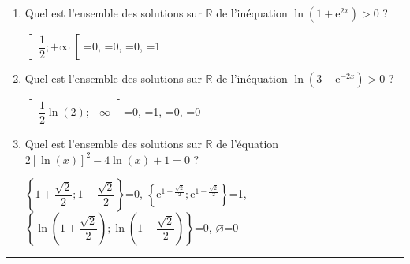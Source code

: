 \documentclass[french]{article}
\begin{document}
\begin{spacing}{1.2}
\begin{enumerate}
\item Quel est l'ensemble des solutions sur \(\mathbb{R}\) de l'inéquation \(\ln\left(1+\text{e}^{2x}\right)>0\) ?

\begin{Form}
\ChoiceMenu[radio,name=Q6,default=-0,align=0,radiosymbol=\ding{108},height=0.2cm,bordercolor=black]{}
{{\(\left]\dfrac{1}{2};+\infty\right[\)}=0,
\newline {\(\left]\dfrac{-1}{2};+\infty\right[\)}=0,
\newline {\(\left]0;+\infty\right[\)}=0,
=1}
\end{Form}

\item Quel est l'ensemble des solutions sur \(\mathbb{R}\) de l'inéquation \(\ln\left(3-\text{e}^{-2x}\right)>0\) ?

\begin{Form}
\ChoiceMenu[radio,name=Q7,default=-0,align=0,radiosymbol=\ding{108},height=0.2cm,bordercolor=black]{}
{{\(\left]\dfrac{1}{2}\ln(2);+\infty\right[\)}=0,
\newline {\(\left]\dfrac{-1}{2}\ln(2);+\infty\right[\)}=1,
\newline {\(\left]-\infty;\dfrac{1}{2}\ln(2)\right[\)}=0,
\newline {\(\left]-\infty;\dfrac{-1}{2}\ln(2)\right[\)}=0}
\end{Form}

\item Quel est l'ensemble des solutions sur \(\mathbb{R}\) de l'équation \(2\left[\ln(x)\right]^2-4\ln(x)+1=0\) ?

\begin{Form}
\ChoiceMenu[radio,name=Q8,default=-0,align=0,radiosymbol=\ding{108},height=0.2cm,bordercolor=black]{}
{
\(\left\{1+\dfrac{\sqrt{2}}{2};1-\dfrac{\sqrt{2}}{2}\right\}\)=0,
\newline \(\left\{\text{e}^{1+\frac{\sqrt{2}}{2}};\text{e}^{1-\frac{\sqrt{2}}{2}}\right\}\)=1,
\newline \(\left\{\ln\left(1+\dfrac{\sqrt{2}}{2}\right);\ln\left(1-\dfrac{\sqrt{2}}{2}\right)\right\}\)=0,
\newline \(\varnothing\)=0
}
\end{Form}

\end{enumerate}

\hrule


\end{spacing}
\end{document}
